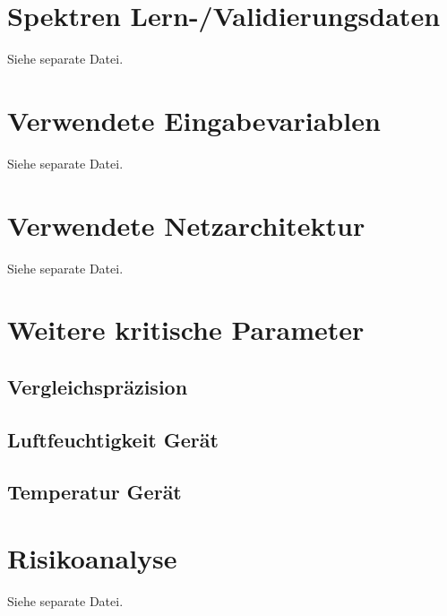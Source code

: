 \documentclass[11pt, a4paper]{article}
\begin{document}
\section{Spektren Lern-/Validierungsdaten}
\label{append:Spektren_Lern-/Validierungsdaten}
Siehe separate Datei.

\section{Verwendete Eingabevariablen}
\label{append:Verwendete_Eingabevariablen}
Siehe separate Datei.

\section{Verwendete Netzarchitektur}
\label{append:Verwendete_Netzarchitektur}
Siehe separate Datei.

\section{Weitere kritische Parameter}
\label{append:Weitere_kritische_Parameter}

\subsection{Vergleichspräzision}



\subsection{Luftfeuchtigkeit Gerät}

\subsection{Temperatur Gerät}

\section{Risikoanalyse}
\label{append:Risikoanalyse}
Siehe separate Datei.
\end{document}
